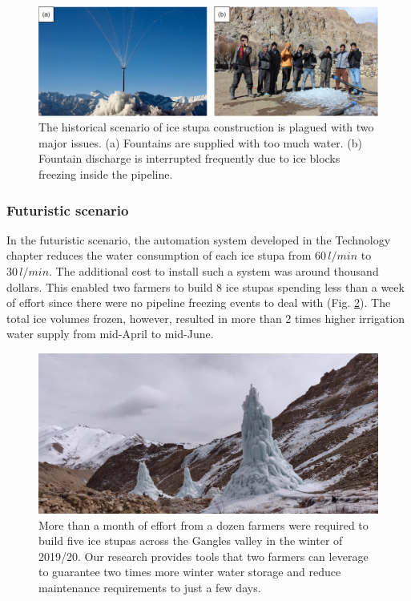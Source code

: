 \begin{figure}[htb]
	\includegraphics[width=\textwidth]{figs/construction_issues}

  \caption{The historical scenario of ice stupa construction is plagued with two major issues. (a) Fountains are
  supplied with too much water. (b) Fountain discharge is interrupted frequently due to ice blocks freezing
  inside the pipeline.}

	\label{fig:issues}
\end{figure}

\subsubsection{Futuristic scenario}

In the futuristic scenario, the automation system developed in the Technology chapter reduces the water
consumption of each ice stupa from $60\,l/min$ to $30\,l/min$. The additional cost to install such a system was
around thousand dollars. This enabled two farmers to build 8 ice stupas spending less than a week of effort
since there were no pipeline freezing events to deal with (Fig. \ref{fig:icestupa_valley}). The total ice
volumes frozen, however, resulted in more than 2 times higher irrigation water supply from mid-April to
mid-June.

\begin{figure}[htb]
	\includegraphics[width=\textwidth]{figs/icestupa_valley}

  \caption{More than a month of effort from a dozen farmers were required to build five ice stupas across the
  Gangles valley in the winter of 2019/20. Our research provides tools that two farmers can leverage to
  guarantee two times more winter water storage and reduce maintenance requirements to just a few days.}

	\label{fig:icestupa_valley}
\end{figure}

